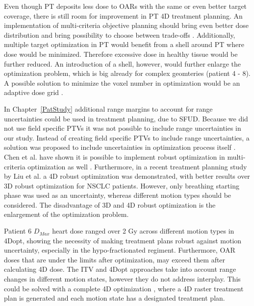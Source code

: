 \documentclass[type=dr, dr=rernat, accentcolor=tud7b,colorbacktitle, bigchapter, openright, twoside, 12pt ]{tudthesis}
\begin{document}
Even though PT deposits less dose to OARs with the same or even better target coverage, there is still room for improvement in PT 4D treatment planning. 
An implementation of multi-criteria objective planning should bring even better dose distribution and bring possibility to choose between trade-offs \cite{Breedveld2007, Chen2010}. 
Additionally, multiple target optimization in PT would benefit from a shell around PT where dose would be minimized. Therefore excessive dose
in healthy tissue would be further reduced. An introduction of a shell, however, would further enlarge the optimization problem, which is big already for complex geomteries (patient 4 - 8). 
A possible solution to minimize the voxel number in optimization would be an adaptive dose grid \cite{Prall2016a}.

In Chapter~\ref{PatStudy} additional range margins to account for range uncertainties could be used in treatment planning, due to SFUD. 
Because we did not use field specific PTVs it was not possible to include range uncertainties in our study.
Instead of creating field specific PTVs to include range uncertainties, a solution was proposed to include uncertainties in optimization process itself \cite{Pflugfelder2008, Unkelbach2009, Fredriksson2011, Chen2012}.
Chen et al. have shown it is possible to implement robust optimization in multi-criteria optimization as well \cite{Chen2012}. Furthermore, in a recent treatment planning study by Liu et al. \cite{Liu2016}
a 4D robust optimization was demonstrated, with better results over 3D robust optimization for NSCLC patients. However, only breathing starting phase was used as an uncertainty,
whereas different motion types should be considered. The disadvantage of 3D and 4D robust optimization is the enlargement of the optimization problem.

Patient 6 $D_{Max}$ heart dose ranged over 2 Gy across different motion types in 4Dopt, showing the necessity of making treatment plans robust against motion uncertainty, 
especially in the hypo-fractionated regiment. Furthermore, OAR doses that are under the limits after optimization, may exceed them after calculating 4D dose. 
The ITV and 4Dopt approaches take into account range changes in different motion states, however they do not address interplay. 
This could be solved with a complete 4D optimization \cite{Graeff2013}, where a 4D raster treatment plan is 
generated and each motion state has a designated treatment plan. 

\end{document}
